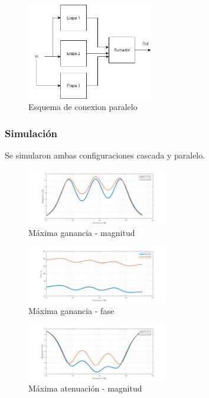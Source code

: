 \documentclass[../../tc_tp3_main.tex]{subfiles}
\begin{document}
\begin{figure}[H]
\centering
\includegraphics[width=0.5\textwidth]{imagenes/paralelo.png}
\caption{Esquema de conexion paralelo} 
\end{figure}


\subsubsection{Simulación}
Se simularon ambas configuraciones cascada y paralelo.

\begin{figure}[H]
\centering
\includegraphics[width=0.55\textwidth]{imagenes/parCasSimMax_m.png}
\caption{M\'axima ganancia - magnitud} 
\end{figure}

\begin{figure}[H]
\centering
\includegraphics[width=0.55\textwidth]{imagenes/parCasSimMax_f.png}
\caption{M\'axima ganancia - fase} 
\end{figure}

\begin{figure}[H]
\centering
\includegraphics[width=0.55\textwidth]{imagenes/parCasSimMin_m.png}
\caption{M\'axima atenuación - magnitud} 
\end{figure}
\end{document}
